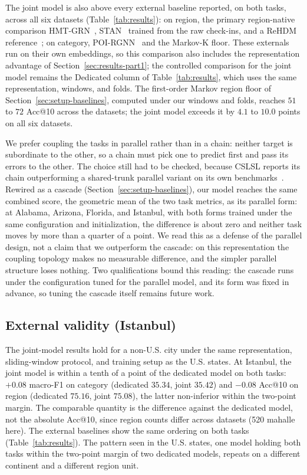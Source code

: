 The joint model is also above every external baseline reported, on both tasks,
across all six datasets (Table~\ref{tab:results}): on region, the primary
region-native comparison HMT-GRN~\cite{lim2022hmtgrn}, STAN~\cite{luo2021stan}
trained from the raw check-ins, and a ReHDM reference~\cite{li2025rehdm}; on
category, POI-RGNN~\cite{capanema2023poirgnn} and the Markov-K floor. These externals run on their own embeddings, so this comparison
also includes the representation advantage of Section~\ref{sec:results-part1}; the
controlled comparison for the joint model remains the Dedicated column of
Table~\ref{tab:results}, which uses the same representation, windows, and
folds. The first-order Markov region floor of Section~\ref{sec:setup-baselines},
computed under our windows and folds, reaches $51$ to $72$ Acc@10 across the
datasets; the joint model exceeds it by $4.1$ to $10.0$ points on all six
datasets.

We prefer coupling the tasks in parallel rather than in a chain: neither target is
subordinate to the other, so a chain must pick one to predict first and pass its errors to the other. The choice still had to be checked, because CSLSL reports its chain outperforming a shared-trunk parallel variant on its own benchmarks~\cite{huang2024cslsl}. Rewired as a cascade
(Section~\ref{sec:setup-baselines}), our model reaches the same combined
score, the geometric mean of the two task metrics, as its parallel form: at Alabama, Arizona, Florida, and Istanbul, with both forms trained under the same configuration and initialization, the difference is about zero and neither task moves by more than a quarter of a point. We read this as a defense of the
parallel design, not a claim that we outperform the cascade: on this
representation the coupling topology makes no measurable difference, and the simpler parallel structure loses nothing. Two qualifications bound this
reading: the cascade runs under the configuration tuned for the parallel model, and
its form was fixed in advance, so tuning the cascade itself remains future work.

\subsection{External validity (Istanbul)}
\label{sec:results-external}
The joint-model results hold for a non-U.S. city under the same representation, sliding-window protocol, and training setup as the U.S. states. At Istanbul, the
joint model is within a tenth of a point of the dedicated model on both tasks: $+0.08$ macro-F1 on
category (dedicated $35.34$, joint $35.42$) and $-0.08$ Acc@10 on region (dedicated $75.16$, joint
$75.08$), the latter non-inferior within the two-point margin. The comparable quantity is the
difference against the dedicated model, not the absolute
Acc@10, since region counts differ across datasets (520 mahalle here). The external baselines show the same ordering on both tasks
(Table~\ref{tab:results}).
The pattern seen in the U.S. states, one model holding both tasks within the two-point margin of two
dedicated models, repeats on a different continent and a different region unit.

